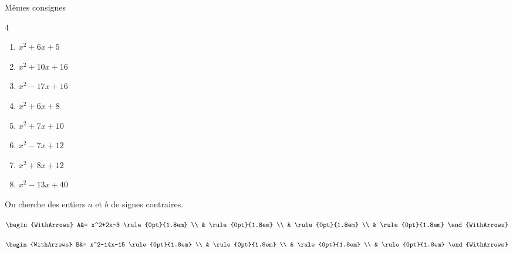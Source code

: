 \documentclass[main.tex]{subfiles}
\begin{document}
\begin{exercise}[À vous]\label{chapitre03:factorisation:essaierreur01}\label{chapitre03:exercice:factorisationparessaierreur:niveau01}  Mêmes consignes\vspace{-1em}
	\begin{multicols}{4} 
		\begin{enumerate}[label={$\Alph*(x)=$\rule{0pt}{1.8em}}, leftmargin=*] 
			\item $x^2+6x+5$
			\item $x^2+10x+16$
			\item $x^2-17x+16$
			\item $x^2+6x+8$
			\item $x^2+7x+10$
			\item $x^2-7x+12$
			\item $x^2+8x+12$
			\item $x^2-13x+40$
		\end{enumerate}
	\end{multicols}
\end{exercise}
%	
\begin{example}[Cas p<0] On cherche des entiers $a$ et $b$ de signes contraires.
	
	\noindent\parbox{0.45\linewidth}{	
		$\begin{WithArrows}
			A&= x^2+2x-3 \rule{0pt}{1.8em} \\ 
			& \rule{0pt}{1.8em}  \\  
			&  \rule{0pt}{1.8em}  \\  
			&  \rule{0pt}{1.8em}     
		\end{WithArrows}$
	}   \hfill\parbox{0.48\linewidth}{	
		$\begin{WithArrows}
			B&=  x^2-14x-15  \rule{0pt}{1.8em} \\ 
			& \rule{0pt}{1.8em}  \\  
			&  \rule{0pt}{1.8em}   \\  
			&  \rule{0pt}{1.8em}    
		\end{WithArrows}$
	}   
\vfill
\end{example}
\end{document}

